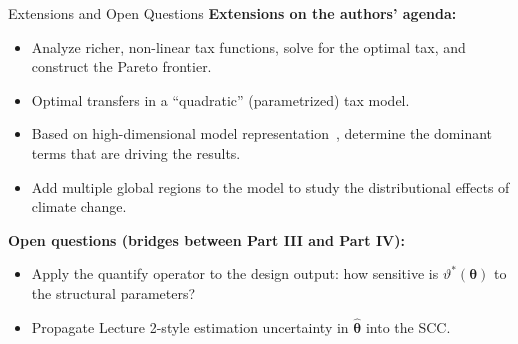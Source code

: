 \documentclass[aspectratio=169,11pt]{beamer}
\newcommand{\emphc}[1]{\textcolor{harvardcrimson}{#1}}
\begin{document}
\begin{frame}{Extensions and Open Questions}
\small
\textbf{Extensions on the authors' agenda:}
\begin{itemize}\itemsep2pt
\item Analyze richer, non-linear tax functions, solve for the optimal tax, and construct the Pareto frontier.
\item Optimal transfers in a ``quadratic'' (parametrized) tax model.
\item Based on high-dimensional model representation~\citep{eftekhari_2022}, determine the dominant terms that are driving the results.
\item Add multiple global regions to the model to study the distributional effects of climate change.
\end{itemize}
\vspace{0.5em}
\textbf{Open questions (bridges between Part III and Part IV):}
\begin{itemize}\itemsep2pt
\item Apply the \emphc{quantify} operator to the \emphc{design} output: how sensitive is $\vartheta^*(\bm{\theta})$ to the structural parameters?
\item Propagate Lecture 2-style estimation uncertainty in $\hat{\bm{\theta}}$ into the SCC.
\end{itemize}
\end{frame}
\end{document}
